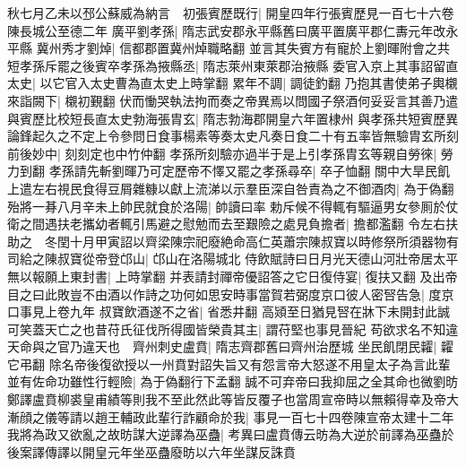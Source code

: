 秋七月乙未以邳公蘇威為納言　初張賓歷既行|{
	開皇四年行張賓歷見一百七十六卷陳長城公至德二年}
廣平劉孝孫|{
	隋志武安郡永平縣舊曰廣平置廣平郡仁夀元年改永平縣}
冀州秀才劉焯|{
	信都郡置冀州焯職略翻}
並言其失賓方有寵於上劉暉附會之共短孝孫斥罷之後賓卒孝孫為掖縣丞|{
	隋志萊州東萊郡治掖縣}
委官入京上其事詔留直太史|{
	以它官入太史曹為直太史上時掌翻}
累年不調|{
	調徒釣翻}
乃抱其書使弟子輿櫬來詣闕下|{
	櫬初覲翻}
伏而慟哭執法拘而奏之帝異焉以問國子祭酒何妥妥言其善乃遣與賓歷比校短長直太史勃海張胄玄|{
	隋志勃海郡開皇六年置棣州}
與孝孫共短賓歷異論鋒起久之不定上令參問日食事楊素等奏太史凡奏日食二十有五率皆無驗胄玄所刻前後妙中|{
	刻刻定也中竹仲翻}
孝孫所刻驗亦過半于是上引孝孫胄玄等親自勞徠|{
	勞力到翻}
孝孫請先斬劉暉乃可定歷帝不懌又罷之孝孫尋卒|{
	卒子恤翻}
關中大旱民飢上遣左右視民食得豆屑雜糠以獻上流涕以示羣臣深自咎責為之不御酒肉|{
	為于偽翻}
殆將一朞八月辛未上帥民就食於洛陽|{
	帥讀曰率}
勅斥候不得輒有驅逼男女參厠於仗衛之間遇扶老攜幼者輒引馬避之慰勉而去至艱險之處見負擔者|{
	擔都濫翻}
令左右扶助之　冬閏十月甲寅詔以齊梁陳宗祀廢絶命高仁英蕭宗陳叔寶以時修祭所須器物有司給之陳叔寶從帝登邙山|{
	邙山在洛陽城北}
侍飲賦詩曰日月光天德山河壯帝居太平無以報願上東封書|{
	上時掌翻}
并表請封禪帝優詔答之它日復侍宴|{
	復扶又翻}
及出帝目之曰此敗豈不由酒以作詩之功何如思安時事當賀若弼度京口彼人密唘告急|{
	度京口事見上卷九年}
叔寶飲酒遂不之省|{
	省悉井翻}
高熲至日猶見唘在牀下未開封此誠可笑蓋天亡之也昔苻氏征伐所得國皆榮貴其主|{
	謂苻堅也事見晉紀}
苟欲求名不知違天命與之官乃違天也　齊州刺史盧賁|{
	隋志齊郡舊曰齊州治歷城}
坐民飢閉民糶|{
	糶它弔翻}
除名帝後復欲授以一州賁對詔失旨又有怨言帝大怒遂不用皇太子為言此輩並有佐命功雖性行輕險|{
	為于偽翻行下孟翻}
誠不可弃帝曰我抑屈之全其命也微劉昉鄭譯盧賁柳裘皇甫績等則我不至此然此等皆反覆子也當周宣帝時以無賴得幸及帝大漸顔之儀等請以趙王輔政此輩行詐顧命於我|{
	事見一百七十四卷陳宣帝太建十二年}
我將為政又欲亂之故昉謀大逆譯為巫蠱|{
	考異曰盧賁傳云昉為大逆於前譯為巫蠱於後案譯傳譯以開皇元年坐巫蠱廢昉以六年坐謀反誅賁}


